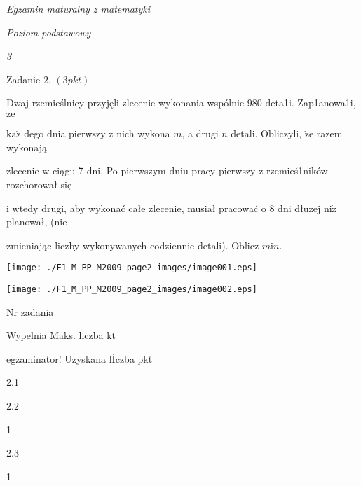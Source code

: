 \documentclass[a4paper,12pt]{article}
\begin{document}
{\it Egzamin maturalny z matematyki}

{\it Poziom podstawowy}

{\it 3}

Zadanie 2. $(3pkt)$

Dwaj rzemieślnicy przyjęli zlecenie wykonania wspólnie 980 deta1i. Zap1anowa1i, $\dot{\mathrm{z}}\mathrm{e}$

$\mathrm{k}\mathrm{a}\dot{\mathrm{z}}$ dego dnia pierwszy z nich wykona $m$, a drugi $n$ detali. Obliczyli, $\dot{\mathrm{z}}\mathrm{e}$ razem wykonają

zlecenie w ciągu 7 dni. Po pierwszym dniu pracy pierwszy z rzemieś1ników rozchorował się

i wtedy drugi, aby wykonać całe zlecenie, musiał pracować o 8 dni dłuzej $\mathrm{n}\mathrm{i}\dot{\mathrm{z}}$ planował, (nie

zmieniając liczby wykonywanych codziennie detali). Oblicz $m \mathrm{i} n.$
\begin{center}
\texttt{[image: ./F1\_M\_PP\_M2009\_page2\_images/image001.eps]}

\texttt{[image: ./F1\_M\_PP\_M2009\_page2\_images/image002.eps]}
\end{center}
Nr zadania

Wypelnia Maks. liczba kt

egzaminator! Uzyskana lÍczba pkt

2.1

2.2

1

2.3

1
\end{document}
